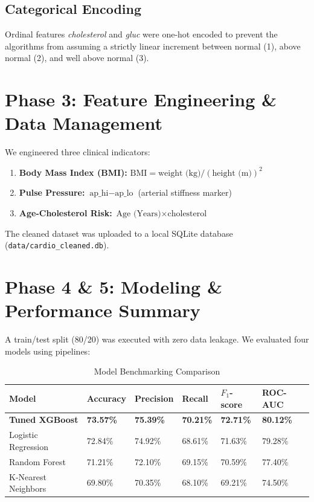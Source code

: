 \documentclass[11pt,a4paper]{article}
\begin{document}
\subsection{Categorical Encoding}
Ordinal features \textit{cholesterol} and \textit{gluc} were one-hot encoded to prevent the algorithms from assuming a strictly linear increment between normal (1), above normal (2), and well above normal (3).

\section{Phase 3: Feature Engineering \& Data Management}
We engineered three clinical indicators:
\begin{enumerate}
    \item \textbf{Body Mass Index (BMI):} $\text{BMI} = \text{weight (kg)} / (\text{height (m)})^2$
    \item \textbf{Pulse Pressure:} $\text{ap\_hi} - \text{ap\_lo}$ (arterial stiffness marker)
    \item \textbf{Age-Cholesterol Risk:} $\text{Age (Years)} \times \text{cholesterol}$
\end{enumerate}

The cleaned dataset was uploaded to a local SQLite database (\texttt{data/cardio\_cleaned.db}).

\section{Phase 4 \& 5: Modeling \& Performance Summary}
A train/test split (80/20) was executed with zero data leakage. We evaluated four models using pipelines:
\begin{table}[htbp]
\centering
\caption{Model Benchmarking Comparison}
\begin{tabular}{llllll}
\toprule
Model & Accuracy & Precision & Recall & $F_1$-score & ROC-AUC \\
\midrule
\textbf{Tuned XGBoost} & \textbf{73.57\%} & \textbf{75.39\%} & \textbf{70.21\%} & \textbf{72.71\%} & \textbf{80.12\%} \\
Logistic Regression & 72.84\% & 74.92\% & 68.61\% & 71.63\% & 79.28\% \\
Random Forest & 71.21\% & 72.10\% & 69.15\% & 70.59\% & 77.40\% \\
K-Nearest Neighbors & 69.80\% & 70.35\% & 68.10\% & 69.21\% & 74.50\% \\
\bottomrule
\end{tabular}
\end{table}
\end{document}
